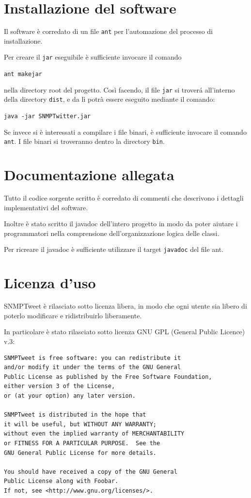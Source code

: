 \documentclass[a4paper, 10pt]{article}
\begin{document}
\section{Installazione del software}

Il software \`e corredato di un file \texttt{ant} per l'automazione del processo di installazione.

Per creare il \texttt{jar} eseguibile \`e sufficiente invocare il comando 
\begin{center}
\texttt{ant makejar}
\end{center}
nella directory root del progetto. Cos\`i facendo, il file \texttt{jar} si trover\'a all'interno della directory \texttt{dist}, e da l\`i potr\`a essere eseguito mediante il comando:

\begin{center}
	\texttt{java -jar SNMPTwitter.jar}
\end{center}

Se invece si \`e interessati a compilare i file binari, \`e sufficiente invocare il comando \texttt{ant}. I file binari si troveranno dentro la directory \texttt{bin}.


\section{Documentazione allegata}

Tutto il codice sorgente scritto \`e corredato di commenti che descrivono i dettagli implementativi del software.

Inoltre \`e stato scritto il javadoc dell'intero progetto in modo da poter aiutare i programmatori nella comprensione dell'organizzazione logica delle classi.

Per ricreare il javadoc \`e sufficiente utilizzare il target \texttt{javadoc} del file ant.

\section{Licenza d'uso}
SNMPTweet \`e rilasciato sotto licenza libera, in modo che ogni utente sia libero di poterlo modificare e ridistribuirlo liberamente.

In particolare \`e stato rilasciato sotto licenza GNU GPL (General Public Licence) v.3: 
\begin{verbatim}
SNMPTweet is free software: you can redistribute it 
and/or modify it under the terms of the GNU General 
Public License as published by the Free Software Foundation,
either version 3 of the License,
or (at your option) any later version.

SNMPTweet is distributed in the hope that
it will be useful, but WITHOUT ANY WARRANTY;
without even the implied warranty of MERCHANTABILITY
or FITNESS FOR A PARTICULAR PURPOSE.  See the
GNU General Public License for more details.

You should have received a copy of the GNU General 
Public License along with Foobar. 
If not, see <http://www.gnu.org/licenses/>.
\end{verbatim}
\end{document}
